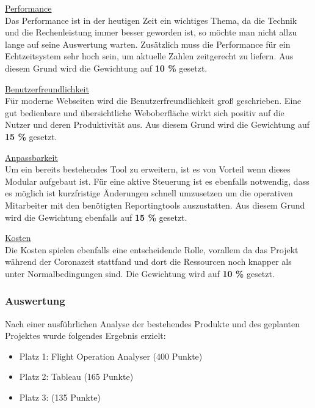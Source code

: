 		\vspace{8pt}

		{
			\noindent
			\underline{Performance}\\
			Das Performance ist in der heutigen Zeit ein wichtiges Thema, da die Technik und die Rechenleistung immer besser geworden ist, so möchte man nicht allzu lange auf seine Auswertung warten. Zusätzlich muss die Performance für ein Echtzeitsystem sehr hoch sein, um aktuelle Zahlen zeitgerecht zu liefern. Aus diesem Grund wird die Gewichtung auf \textbf{10 \%} gesetzt.
		}

		\vspace{8pt}

		{
			\noindent
			\underline{Benutzerfreundlichkeit}\\
			Für moderne Webseiten wird die Benutzerfreundlichkeit groß geschrieben. Eine gut bedienbare und übersichtliche Weboberfläche wirkt sich positiv auf die Nutzer und deren Produktivität aus. Aus diesem Grund wird die Gewichtung auf \textbf{15 \%} gesetzt.
		}

		\vspace{8pt}

		{
			\noindent
			\underline{Anpassbarkeit}\\
			Um ein bereits bestehendes Tool zu erweitern, ist es von Vorteil wenn dieses Modular aufgebaut ist. Für eine aktive Steuerung ist es ebenfalls notwendig, dass es möglich ist kurzfristige Änderungen schnell umzusetzen um die operativen Mitarbeiter mit den benötigten Reportingtools auszustatten. Aus diesem Grund wird die Gewichtung ebenfalls auf \textbf{15 \%} gesetzt.
		}

		\vspace{8pt}

		{
			\noindent
			\underline{Kosten}\\
			Die Kosten spielen ebenfalls eine entscheidende Rolle, vorallem da das Projekt während der Coronazeit stattfand und dort die Ressourcen noch knapper als unter Normalbedingungen sind. Die Gewichtung wird auf \textbf{10 \%} gesetzt.
		}

		\subsubsection{Auswertung}
		Nach einer ausführlichen Analyse der bestehendes Produkte und des geplanten Projektes wurde folgendes Ergebnis erzielt:

		\begin{itemize}
			\item Platz 1: Flight Operation Analyser (400 Punkte)
			\item Platz 2: Tableau (165 Punkte)
			\item Platz 3:  (135 Punkte)
		\end{itemize}

